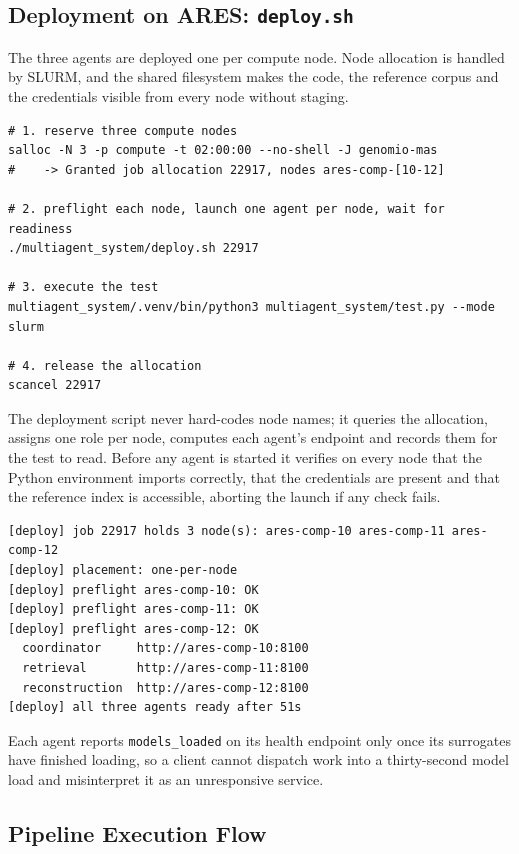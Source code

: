 \subsection{Deployment on ARES: \texttt{deploy.sh}}

The three agents are deployed one per compute node. Node allocation is handled by SLURM, and
the shared filesystem makes the code, the reference corpus and the credentials visible from
every node without staging.

\begin{verbatim}
# 1. reserve three compute nodes
salloc -N 3 -p compute -t 02:00:00 --no-shell -J genomio-mas
#    -> Granted job allocation 22917, nodes ares-comp-[10-12]

# 2. preflight each node, launch one agent per node, wait for readiness
./multiagent_system/deploy.sh 22917

# 3. execute the test
multiagent_system/.venv/bin/python3 multiagent_system/test.py --mode slurm

# 4. release the allocation
scancel 22917
\end{verbatim}

The deployment script never hard-codes node names; it queries the allocation, assigns one role
per node, computes each agent's endpoint and records them for the test to read. Before any
agent is started it verifies on every node that the Python environment imports correctly, that
the credentials are present and that the reference index is accessible, aborting the launch if
any check fails.

\begin{verbatim}
[deploy] job 22917 holds 3 node(s): ares-comp-10 ares-comp-11 ares-comp-12
[deploy] placement: one-per-node
[deploy] preflight ares-comp-10: OK
[deploy] preflight ares-comp-11: OK
[deploy] preflight ares-comp-12: OK
  coordinator     http://ares-comp-10:8100
  retrieval       http://ares-comp-11:8100
  reconstruction  http://ares-comp-12:8100
[deploy] all three agents ready after 51s
\end{verbatim}

Each agent reports \texttt{models\_loaded} on its health endpoint only once its surrogates have
finished loading, so a client cannot dispatch work into a thirty-second model load and
misinterpret it as an unresponsive service.

\subsection{Pipeline Execution Flow}

